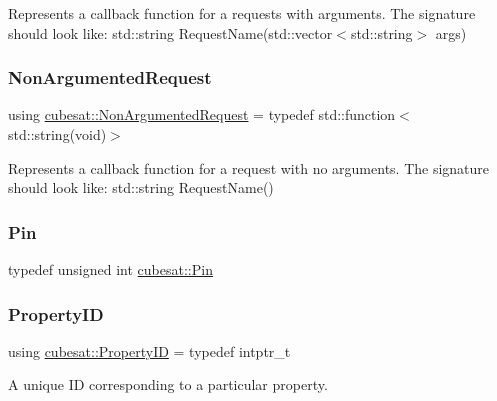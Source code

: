 Represents a callback function for a requests with arguments. The signature should look like\+: \textquotesingle{}std\+::string Request\+Name(std\+::vector$<$std\+::string$>$ args)\textquotesingle{} \mbox{\label{namespacecubesat_a494b2feec3d999510e5772da5c0b354c}} 
\subsubsection{\texorpdfstring{Non\+Argumented\+Request}{NonArgumentedRequest}}
{\footnotesize\ttfamily using \hyperlink{namespacecubesat_a494b2feec3d999510e5772da5c0b354c}{cubesat\+::\+Non\+Argumented\+Request} = typedef std\+::function$<$std\+::string(void)$>$}

Represents a callback function for a request with no arguments. The signature should look like\+: \textquotesingle{}std\+::string Request\+Name()\textquotesingle{} \mbox{\label{namespacecubesat_af928ed4b56ef60d75953a91225b37a00}} 
\subsubsection{\texorpdfstring{Pin}{Pin}}
{\footnotesize\ttfamily typedef unsigned int \hyperlink{namespacecubesat_af928ed4b56ef60d75953a91225b37a00}{cubesat\+::\+Pin}}

\mbox{\label{namespacecubesat_ab5c769503b8a77bc90a47ca8705f2f86}} 
\subsubsection{\texorpdfstring{Property\+ID}{PropertyID}}
{\footnotesize\ttfamily using \hyperlink{namespacecubesat_ab5c769503b8a77bc90a47ca8705f2f86}{cubesat\+::\+Property\+ID} = typedef intptr\+\_\+t}



A unique ID corresponding to a particular property. 

\mbox{\label{namespacecubesat_a3b98f17d41bf0e37fe0d382b897f9692}} 

